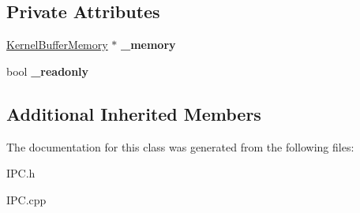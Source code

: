 \subsection*{Private Attributes}
\begin{DoxyCompactItemize}
\item 
\mbox{\label{class_kernel_buffer_memory_1_1_map_a2726c57e46c1a5e2c74fd5b80774371f}} 
\hyperlink{class_kernel_buffer_memory}{Kernel\+Buffer\+Memory} $\ast$ {\bfseries \+\_\+memory}
\item 
\mbox{\label{class_kernel_buffer_memory_1_1_map_aae9cb05083c3af56ac8267e809291886}} 
bool {\bfseries \+\_\+readonly}
\end{DoxyCompactItemize}
\subsection*{Additional Inherited Members}


The documentation for this class was generated from the following files\+:\begin{DoxyCompactItemize}
\item 
I\+P\+C.\+h\item 
I\+P\+C.\+cpp\end{DoxyCompactItemize}
